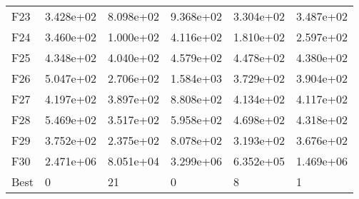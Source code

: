 \begin{tabular}{llllll}
F23  &  3.428e+02 &  8.098e+02 &  9.368e+02 &  3.304e+02 &  3.487e+02 \\
F24  &  3.460e+02 &  1.000e+02 &  4.116e+02 &  1.810e+02 &  2.597e+02 \\
F25  &  4.348e+02 &  4.040e+02 &  4.579e+02 &  4.478e+02 &  4.380e+02 \\
F26  &  5.047e+02 &  2.706e+02 &  1.584e+03 &  3.729e+02 &  3.904e+02 \\
F27  &  4.197e+02 &  3.897e+02 &  8.808e+02 &  4.134e+02 &  4.117e+02 \\
F28  &  5.469e+02 &  3.517e+02 &  5.958e+02 &  4.698e+02 &  4.318e+02 \\
F29  &  3.752e+02 &  2.375e+02 &  8.078e+02 &  3.193e+02 &  3.676e+02 \\
F30  &  2.471e+06 &  8.051e+04 &  3.299e+06 &  6.352e+05 &  1.469e+06 \\
Best &          0 &         21 &          0 &          8 &          1 \\
\bottomrule
\end{tabular}
